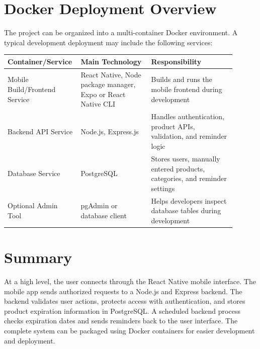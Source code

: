 \documentclass[12pt]{article}
\begin{document}
\section*{Docker Deployment Overview}

The project can be organized into a multi-container Docker environment. A typical development deployment may include the following services:

\begin{longtable}{|p{0.24\linewidth}|p{0.30\linewidth}|p{0.36\linewidth}|}
\hline
\textbf{Container/Service} & \textbf{Main Technology} & \textbf{Responsibility} \\
\hline
Mobile Build/Frontend Service & React Native, Node package manager, Expo or React Native CLI & Builds and runs the mobile frontend during development \\
\hline
Backend API Service & Node.js, Express.js & Handles authentication, product APIs, validation, and reminder logic \\
\hline
Database Service & PostgreSQL & Stores users, manually entered products, categories, and reminder settings \\
\hline
Optional Admin Tool & pgAdmin or database client & Helps developers inspect database tables during development \\
\hline
\end{longtable}

\section*{Summary}

At a high level, the user connects through the React Native mobile interface. The mobile app sends authorized requests to a Node.js and Express backend. The backend validates user actions, protects access with authentication, and stores product expiration information in PostgreSQL. A scheduled backend process checks expiration dates and sends reminders back to the user interface. The complete system can be packaged using Docker containers for easier development and deployment.
\end{document}
